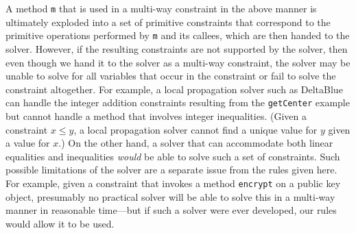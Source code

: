 \documentclass[10pt,reprint]{sigplanconf-preprint}
\begin{document}
A method \verb|m| that is used in a multi-way constraint in the above
manner is ultimately exploded into a set of primitive constraints that
correspond to the primitive operations performed by \verb|m| and its
callees, which are then handed to the solver.  However, if the
resulting constraints are not supported by the solver, then even
though we hand it to the solver as a multi-way constraint, the solver
may be unable to solve for all variables that occur in the constraint
or fail to solve the constraint altogether. For example, a local
propagation solver such as DeltaBlue can handle the integer addition
constraints resulting from the \verb|getCenter| example but cannot
handle a method that involves integer inequalities.  (Given a
constraint $x \leq y$, a local propagation solver cannot find a unique
value for $y$ given a value for $x$.)  On the other hand, a solver
that can accommodate both linear equalities and inequalities
\emph{would} be able to solve such a set of constraints. Such possible
limitations of the solver are a separate issue from the rules given
here. For example, given a constraint that invokes a method
\verb|encrypt| on a public key object, presumably no practical solver
will be able to solve this in a multi-way manner in reasonable
time---but if such a solver were ever developed, our rules would allow it to
be used.
\end{document}
